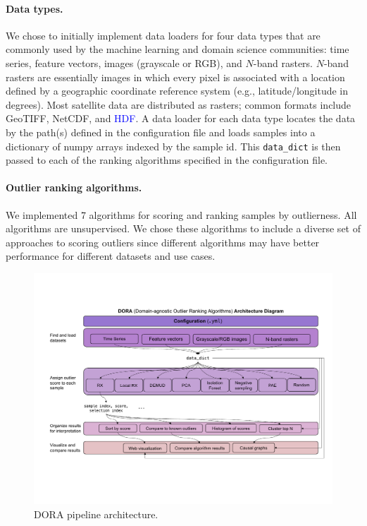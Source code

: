 \documentclass[letterpaper]{article} %
\newcommand{\todo}[1]{\textcolor{blue}{#1}}
\begin{document}
\paragraph{Data types.} We chose to initially implement data loaders for four
data types that are commonly used by the machine learning and domain science
communities: time series, feature vectors, images (grayscale or RGB), and 
$N$-band rasters. $N$-band rasters are essentially images in which every pixel
is associated with a location defined by a geographic coordinate reference 
system (e.g., latitude/longitude in degrees). Most satellite data are 
distributed as rasters; common formats include GeoTIFF, NetCDF, and 
\todo{HDF}. A data loader for each data type locates the data by the path(s)
defined in the configuration file and loads samples into a dictionary of numpy
 arrays indexed by the sample id. This \texttt{data\_dict} is then passed to each of the ranking algorithms specified in 
 the configuration file.

\paragraph{Outlier ranking algorithms.} We implemented 7 algorithms for 
scoring and 
ranking samples by outlierness. All algorithms are unsupervised.
We chose these algorithms to include a diverse
set of approaches to scoring outliers since different algorithms may have 
better performance for different datasets and use cases. 

\begin{figure}
    \centering
    \includegraphics[width=\linewidth]{figures/dora-system-diagram-v5.pdf}
    \caption{DORA pipeline architecture.}
    \label{fig:dora}
\end{figure}
\end{document}
